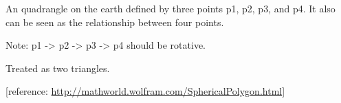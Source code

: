 \documentclass[letterpaper,10pt,english]{sphinxmanual}
\begin{document}
\begin{fulllineitems}
\label{code:pyesg.Quadrangle}
An quadrangle on the earth defined by three points p1, p2, p3, and p4.
It also can be seen as the relationship between four points.

Note: p1 -\textgreater{} p2 -\textgreater{} p3 -\textgreater{} p4 should be rotative.

\begin{fulllineitems}
\label{code:pyesg.Quadrangle.angles}
Treated as two triangles.

\end{fulllineitems}


\begin{fulllineitems}
\label{code:pyesg.Quadrangle.area}
{[}reference: \href{http://mathworld.wolfram.com/SphericalPolygon.html}{http://mathworld.wolfram.com/SphericalPolygon.html}{]}

\end{fulllineitems}


\end{fulllineitems}

\end{document}

